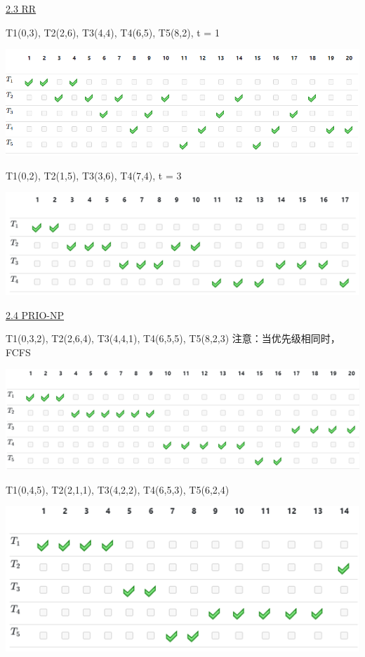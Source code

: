 \documentclass[fleqn]{article}
\begin{document}
\noindent\uline{2.3 RR}

T1(0,3), T2(2,6), T3(4,4), T4(6,5), T5(8,2), t = 1

\begin{center}
    \includegraphics[scale=0.4]{21.png}
\end{center}

T1(0,2), T2(1,5), T3(3,6), T4(7,4), t = 3

\begin{center}
    \includegraphics{8.png}
\end{center}

\noindent\uline{2.4 PRIO-NP}

T1(0,3,2), T2(2,6,4), T3(4,4,1), T4(6,5,5), T5(8,2,3)
注意：当优先级相同时，FCFS

\begin{center}
    \includegraphics{9.png}
\end{center}

T1(0,4,5), T2(2,1,1), T3(4,2,2), T4(6,5,3), T5(6,2,4)

\begin{center}
    \includegraphics{10.png}
\end{center}
\end{document}
